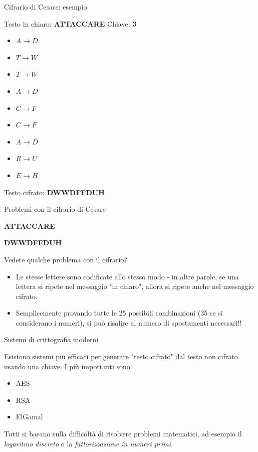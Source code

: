 \documentclass[10pt]{beamer}
\begin{document}
\begin{frame}[fragile]{Cifrario di Cesare: esempio}

Testo in chiaro: \textbf{ATTACCARE} \hspace{15pt} Chiave: \textbf{3}

\begin{itemize}
\item $A \rightarrow D$
\item $T \rightarrow W$
\item $T \rightarrow W$
\item $A \rightarrow D$
\item $C \rightarrow F$
\item $C \rightarrow F$
\item $A \rightarrow D$
\item $R \rightarrow U$
\item $E \rightarrow H$
\end{itemize}

Testo cifrato: \textbf{DWWDFFDUH}

\end{frame}
\begin{frame}[fragile]{Problemi con il cifrario di Cesare}

\textbf{ATTACCARE}

\textbf{DWWDFFDUH}

Vedete qualche problema con il cifrario?

\begin{itemize}
\item \pause Le stesse lettere sono codificate allo stesso modo - in altre parole, se una lettera si ripete nel messaggio "in chiaro", allora si ripete anche nel messaggio cifrato.
\item \pause Semplicemente provando tutte le 25 possibili combinazioni (35 se si considerano i numeri), si può risalire al numero di spostamenti necessari!!
\end{itemize}

\end{frame}

\begin{frame}[fragile]{Sistemi di crittografia moderni}

Esistono sistemi più efficaci per generare "testo cifrato" dal testo non cifrato usando una chiave. I più importanti sono:

\begin{itemize}
\item AES
\item RSA
\item ElGamal
\end{itemize}

Tutti si basano sulla difficoltà di risolvere problemi matematici, ad esempio il \textit{logaritmo discreto} o la \textit{fattorizzazione in numeri primi}.

\end{frame}
\end{document}
